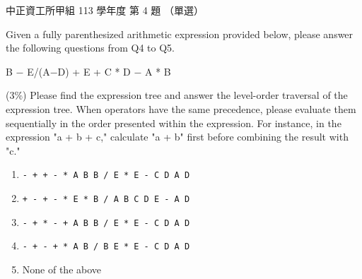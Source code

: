 \begin{pastexam}[label={px:ccu-113-swa-04}]{中正資工所甲組 113 學年度 第 4 題}
（單選）

Given a fully parenthesized arithmetic expression provided below, please answer the following questions from Q4 to Q5.
\begin{center}
B $-$ E/(A$-$D) + E + C * D $-$ A * B
\end{center}

(3\%) Please find the expression tree and answer the level-order traversal of the expression tree. When operators have the same precedence, please evaluate them sequentially in the order presented within the expression. For instance, in the expression "a + b + c," calculate "a + b" first before combining the result with "c."
\begin{enumerate}[label=\Alph*.]
\item \texttt{- + + - * A B B / E * E - C D A D}
\item \texttt{+ - + - * E * B / A B C D E - A D}
\item \texttt{- + * - + A B B / E * E - C D A D}
\item \texttt{- + - + * A B / B E * E - C D A D}
\item None of the above
\end{enumerate}
\end{pastexam}

